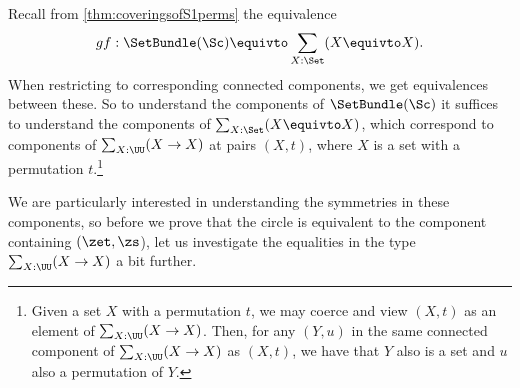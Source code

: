 Recall from \cref{thm:coveringsofS1perms}
the equivalence 
\[
gf: \SetBundle(\Sc) \equivto \sum_{X:\Set}(X\equivto X).
\]
When restricting to corresponding connected components,
we get equivalences between these. 
So to understand the components of $\SetBundle(\Sc)$
it suffices to understand the components of
$\sum_{X:\Set}(X\equivto X)$, which correspond to
components of $\sum_{X:\UU}(X \to X)$ at pairs $(X,t)$,
where $X$ is a set with a permutation $t$.\footnote{%
Given a set $X$ with a permutation $t$, 
we may coerce and view $(X,t)$ as an element of $\sum_{X:\UU}(X\to X)$. 
Then, for any $(Y,u)$ in the same connected component of
$\sum_{X:\UU}(X\to X)$ as $(X,t)$, we have that $Y$ also
is a set and $u$ also a permutation of $Y$.
}

We are particularly interested in understanding the symmetries 
in these components, so before we prove that the circle is equivalent 
to the component containing $(\zet,\zs$), let us investigate the 
equalities in the type $\sum_{X:\UU}(X \to X)$ a bit further.

